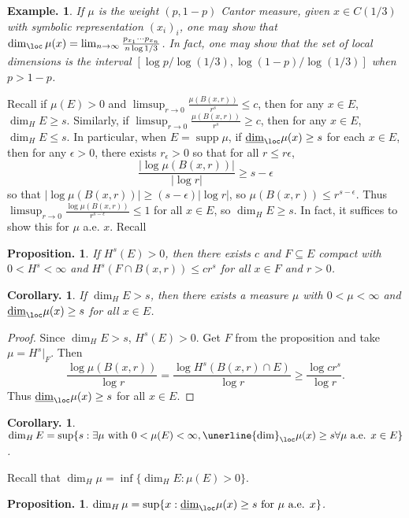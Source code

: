 \documentclass[11pt, a4paper]{memoir}
\theoremstyle{change}
\newtheorem{corollary}[theorem]{Corollary.}
\newtheorem{proposition}[theorem]{Proposition.}
\theoremstyle{plain}
\theoremstyle{nonumberplain}
\newtheorem{example}{Example.}
\newtheorem{proof}{Proof}
\DeclareMathOperator{\supp}{supp}
\numberwithin{equation}{section}
\begin{document}
\begin{example}
    If $\mu$ is the weight $(p,1-p)$ Cantor measure, given $x\in C(1/3)$ with symbolic representation $(x_i)_i$, one may show that $\dim_{\loc}\mu(x)=\lim_{n\to\infty}\frac{p_{x_1}\cdots p_{x_n}}{n\log 1/3}$.
    In fact, one may show that the set of local dimensions is the interval $[\log p/\log(1/3),\log(1-p)/\log(1/3)]$ when $p>1-p$.
\end{example}
Recall if $\mu(E)>0$ and $\limsup_{r\to 0}\frac{\mu(B(x,r))}{r^s}\leq c$, then for any $x\in E$, $\dim_H E\geq s$.
Similarly, if $\limsup_{r\to 0}\frac{\mu(B(x,r))}{r^s}\geq c$, then for any $x\in E$, $\dim_HE\leq s$.
In particular, when $E=\supp\mu$, if $\underline{\dim}_{\loc}\mu(x)\geq s$ for each $x\in E$, then for any $\epsilon>0$, there exists $r_\epsilon>0$ so that for all $r\leq r\epsilon$,
\begin{equation*}
    \frac{|\log \mu(B(x,r))|}{|\log r|}\geq s-\epsilon
\end{equation*}
so that $|\log \mu(B(x,r))|\geq(s-\epsilon)|\log r|$, so $\mu(B(x,r))\leq r^{s-\epsilon}$.
Thus $\limsup_{r\to 0}\frac{\log\mu(B(x,r))}{r^{s-\epsilon}}\leq 1$ for all $x\in E$, so $\dim_H E\geq s$.
In fact, it suffices to show this for $\mu$ a.e. $x$.
Recall
\begin{proposition}
    If $H^s(E)>0$, then there exists $c$ and $F\subseteq E$ compact with $0<H^s<\infty$ and $H^s(F\cap B(x,r))\leq cr^s$ for all $x\in F$ and $r>0$.
\end{proposition}
\begin{corollary}
    If $\dim_H E>s$, then there exists a measure $\mu$ with $0<\mu<\infty$ and $\underline{\dim}_{\loc}\mu(x)\geq s$ for all $x\in E$.
\end{corollary}
\begin{proof}
    Since $\dim_H E>s$, $H^s(E)>0$.
    Get $F$ from the proposition and take $\mu=H^s|_F$.
    Then
    \begin{equation*}
        \frac{\log\mu(B(x,r))}{\log r}=\frac{\log H^s(B(x,r)\cap E)}{\log r}\geq\frac{\log cr^s}{\log r}.
    \end{equation*}
    Thus $\underline{\dim}_{\loc}\mu(x)\geq s$ for all $x\in E$.
\end{proof}
\begin{corollary}
    $\dim_H E=\sup\{s:\exists\mu\text{ with }0<\mu(E)<\infty,\unerline{\dim}_{\loc}\mu(x)\geq s\forall\mu\text{ a.e. }x\in E\}$.
\end{corollary}
Recall that $\dim_H\mu=\inf\{\dim_HE:\mu(E)>0\}$.
\begin{proposition}
    $\dim_H\mu=\sup\{x:\underline{\dim}_{\loc}\mu(x)\geq s\text{ for }\mu\text{ a.e. }x\}$.
\end{proposition}
\end{document}
